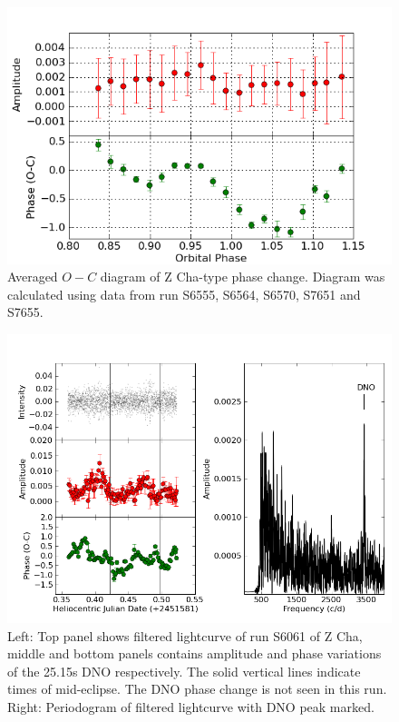 \begin{figure}
 \centering
 \includegraphics[width=0.7\columnwidth,bb=0 0 600 400]{images/averaged_OC/fixed_may2008/z_cha_type/average_OC.png}
 \caption[Averaged $O-C$ diagram of Z Cha-type phase change.]{Averaged $O-C$ diagram of Z Cha-type phase change. Diagram was calculated using data from run S6555, S6564, S6570, S7651 and S7655.}
 \label{fig:z_cha_OC}
\end{figure}


\begin{figure}
 \centering
 \includegraphics[width=\columnwidth,bb=0 0 800 600]{z_cha/z_cha_OC_FT.png}
 
 \caption[Filtered lightcurve,$O-C$ diagram and periodogram of Z Cha.]{Left: Top panel shows filtered lightcurve of run S6061 of Z Cha, middle and bottom panels contains amplitude and phase variations of the 25.15s DNO respectively. The solid vertical lines indicate times of mid-eclipse. The DNO phase change is not seen in this run. Right: Periodogram of filtered lightcurve with DNO peak marked. }
\label{Z_Cha_OC}
\end{figure}


